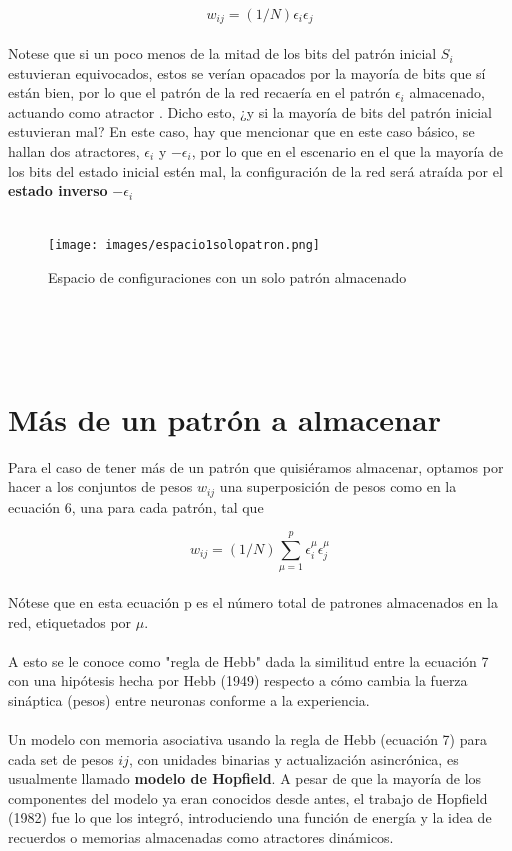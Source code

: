 \documentclass{article}
\begin{document}
\begin{equation}
    w_{ij} = (1/N) \epsilon_i \epsilon_j
    \label{eq:normalización de pesos}
\end{equation}
\\
Notese que si un poco menos de la mitad de los bits  del patrón inicial $S_i$ estuvieran equivocados, estos se verían opacados por la mayoría de bits que sí están bien, por lo que el patrón de la red recaería en el patrón $\epsilon_i$ almacenado, actuando como atractor .
Dicho esto, ¿y si la mayoría de bits del patrón inicial estuvieran mal? En este caso, hay que mencionar que en este caso básico, se hallan dos atractores, $\epsilon_i$ y $-\epsilon_i$, por lo que en el escenario en el que la mayoría de los bits del estado inicial estén mal, la configuración de la red será atraída por el \textbf{estado inverso} $-\epsilon_i$
\\\\
\begin{figure}[h]
\centering
\texttt{[image: images/espacio1solopatron.png]}
\caption{Espacio de configuraciones con un solo patrón almacenado}
\label{fig:Espacio de soluciones}
\end{figure}
\\\\\

\section{Más de un patrón a almacenar}

Para el caso de tener más de un patrón que quisiéramos almacenar, optamos por hacer a los conjuntos de pesos $w_{ij}$ una superposición de pesos como en la ecuación 6, una para cada patrón, tal que

\begin{equation}
    w_{ij} = (1/N) \sum^p_{\mu=1} \epsilon^\mu_i \epsilon^\mu_j
    \label{eq:regla ded hebb}
\end{equation}
\\
Nótese que en esta ecuación p es el número total de patrones almacenados en la red, etiquetados por $\mu$.
\\\\
A esto se le conoce como "regla de Hebb" dada la similitud entre la ecuación 7 con una hipótesis hecha por Hebb (1949) respecto a cómo cambia la fuerza sináptica (pesos) entre neuronas conforme a la experiencia.
\\\\
Un modelo con memoria asociativa usando la regla de Hebb (ecuación 7) para cada set de pesos $ij$, con unidades binarias y actualización asincrónica, es usualmente llamado \textbf{modelo de Hopfield}. A pesar de que la mayoría de los componentes del modelo ya eran conocidos desde antes, el trabajo de Hopfield (1982) fue lo que los integró, introduciendo una función de energía y la idea de recuerdos o memorias almacenadas como atractores dinámicos.
\\\\
\end{document}
